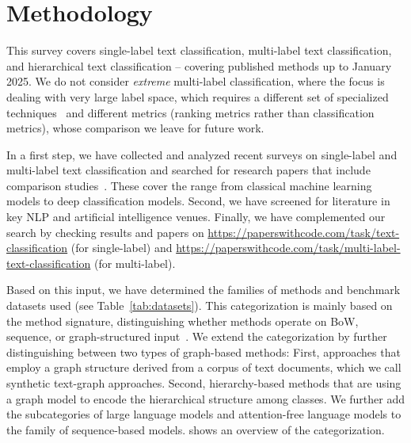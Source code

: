 \documentclass[acmsmall,nonacm]{acmart}
\begin{document}
\section{Methodology}\label{sec:sota}

This survey covers single-label text classification, multi-label text classification, and hierarchical text classification -- covering published methods up to January 2025.
We do not consider \emph{extreme} multi-label classification, where the focus is dealing with very large label space, which requires a different set of specialized techniques~\cite{xml0,xml4,xml3,xml2} and different metrics (ranking metrics rather than classification metrics), whose comparison we leave for future work. 

In a first step, we have collected and analyzed recent surveys on single-label and multi-label text classification and searched for research papers that include comparison studies~\cite{
wang2023graph,
duarte2023review,
buguenoConnectingDotsWhat2023,
DBLP:journals/tist/LiPLXYSYH22,
DBLP:journals/csur/MinaeeKCNCG21,
DBLP:journals/pr/TarekegnGM21,
DBLP:journals/corr/abs-2107-03158,
raihan2021-survey,
DBLP:journals/wias/ZhouGLVTBBK20,
DBLP:conf/esann/QaraeiKB20,
DBLP:journals/corr/abs-2011-11197,
DBLP:journals/information/KowsariMHMBB19,
DBLP:journals/air/Kadhim19,
galkescherp-acl2022,
DBLP:conf/jcdl/MaiGS18,
DBLP:conf/kcap/GalkeMSBS17,
DBLP:conf/sigir/ZhangWYWZ16}.
These cover the range from classical machine learning models to deep classification models.
Second, we have screened for literature in key NLP and artificial intelligence venues.
Finally, we have complemented our search by checking results and papers on \url{https://paperswithcode.com/task/text-classification} (for single-label) and \url{https://paperswithcode.com/task/multi-label-text-classification} (for multi-label).

Based on this input, we have determined the families of methods and benchmark datasets used (see Table~\ref{tab:datasets}).
This categorization is mainly based on the method signature, distinguishing whether methods operate on BoW, sequence, or graph-structured input~\cite{galkescherp-acl2022}. 
We extend the categorization by further distinguishing between two types of graph-based methods: 
First, approaches that employ a graph structure derived from a corpus of text documents, which we call synthetic text-graph approaches. 
Second, hierarchy-based methods that are using a graph model to encode the hierarchical structure among classes. 
We further add the subcategories of large language models and attention-free language models to the family of sequence-based models. 
 shows an overview of the categorization.
\end{document}
